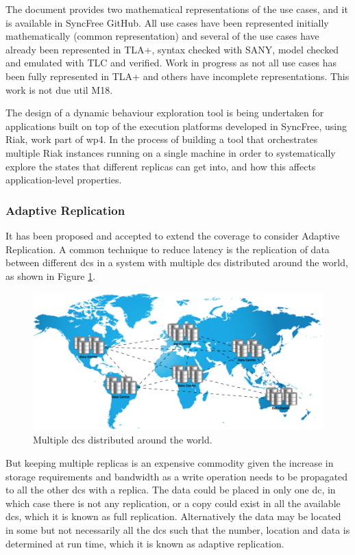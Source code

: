 \documentclass[12pt,twoside]{article}
\begin{document}
The document provides two mathematical representations of the use cases, and it is available in SyncFree GitHub. All use cases have been represented initially mathematically (common representation) and several of the use cases have already been represented in TLA+, syntax checked with SANY, model checked and emulated with TLC and verified. Work in progress as not all use cases has been fully represented in TLA+ and others have incomplete representations. This work is not due util M18.

The design of a dynamic behaviour exploration tool is being undertaken for applications built on top of the execution platforms developed in SyncFree, using Riak, work part of \gls{wp4}. In the process of building a tool that orchestrates multiple Riak instances running on a single machine in order to systematically explore the states that different
replicas can get into, and how this affects application-level properties.


\subsubsection{Adaptive Replication}
It has been proposed and accepted to extend the coverage to consider Adaptive Replication. A common technique to reduce latency is the replication of data between different \glspl{dc} in a system with multiple \glspl{dc} distributed around the world, as shown in Figure \ref{fig:multi-dcs}.
\begin{figure}[ht!]
	\centering
	\includegraphics[width=1\textwidth]{figures/multiDCs.png}
		
	\caption{Multiple \glspl{dc} distributed around the world.}
	\label{fig:multi-dcs}
\end{figure}

But keeping multiple replicas is an expensive commodity given the increase in storage requirements and bandwidth as a write operation needs to be propagated to all the other \glspl{dc} with a replica. The data could be placed in only one \gls{dc}, in which case there is not any replication, or a copy could exist in all the available \glspl{dc}, which it is known as full replication. Alternatively the data may be located in some but not necessarily all the \glspl{dc} such that the number, location and data is determined at run time, which it is known as adaptive replication.
\end{document}
